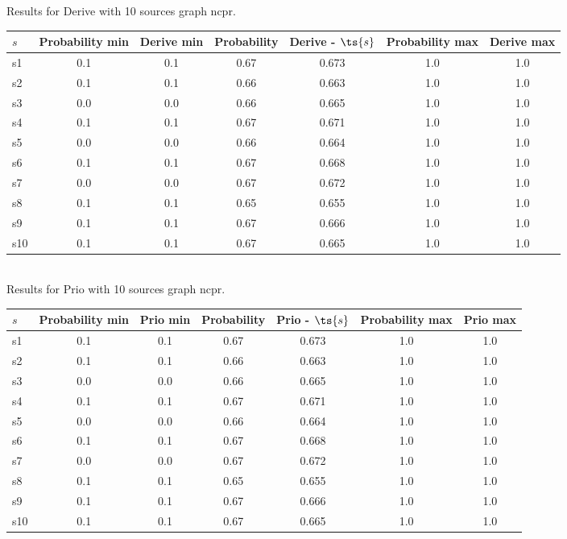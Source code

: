 \documentclass{article}
\begin{document}
\noindent Results for Derive with 10 sources graph ncpr.

\noindent\begin{tabular}{|l|c|c|c|c|c|c|}
\hline
$s$& Probability min & Derive min & Probability & Derive - $\ts{s}$ & Probability max & Derive max\\
\hline
s1 &0.1 & 0.1 & 0.67 & 0.673 & 1.0 & 1.0\\
\hline
s2 &0.1 & 0.1 & 0.66 & 0.663 & 1.0 & 1.0\\
\hline
s3 &0.0 & 0.0 & 0.66 & 0.665 & 1.0 & 1.0\\
\hline
s4 &0.1 & 0.1 & 0.67 & 0.671 & 1.0 & 1.0\\
\hline
s5 &0.0 & 0.0 & 0.66 & 0.664 & 1.0 & 1.0\\
\hline
s6 &0.1 & 0.1 & 0.67 & 0.668 & 1.0 & 1.0\\
\hline
s7 &0.0 & 0.0 & 0.67 & 0.672 & 1.0 & 1.0\\
\hline
s8 &0.1 & 0.1 & 0.65 & 0.655 & 1.0 & 1.0\\
\hline
s9 &0.1 & 0.1 & 0.67 & 0.666 & 1.0 & 1.0\\
\hline
s10 &0.1 & 0.1 & 0.67 & 0.665 & 1.0 & 1.0\\
\hline
\end{tabular}\\

\noindent Results for Prio with 10 sources graph ncpr.

\noindent\begin{tabular}{|l|c|c|c|c|c|c|}
\hline
$s$& Probability min & Prio min & Probability & Prio - $\ts{s}$ & Probability max & Prio max\\
\hline
s1 &0.1 & 0.1 & 0.67 & 0.673 & 1.0 & 1.0\\
\hline
s2 &0.1 & 0.1 & 0.66 & 0.663 & 1.0 & 1.0\\
\hline
s3 &0.0 & 0.0 & 0.66 & 0.665 & 1.0 & 1.0\\
\hline
s4 &0.1 & 0.1 & 0.67 & 0.671 & 1.0 & 1.0\\
\hline
s5 &0.0 & 0.0 & 0.66 & 0.664 & 1.0 & 1.0\\
\hline
s6 &0.1 & 0.1 & 0.67 & 0.668 & 1.0 & 1.0\\
\hline
s7 &0.0 & 0.0 & 0.67 & 0.672 & 1.0 & 1.0\\
\hline
s8 &0.1 & 0.1 & 0.65 & 0.655 & 1.0 & 1.0\\
\hline
s9 &0.1 & 0.1 & 0.67 & 0.666 & 1.0 & 1.0\\
\hline
s10 &0.1 & 0.1 & 0.67 & 0.665 & 1.0 & 1.0\\
\hline
\end{tabular}\\
\end{document}
